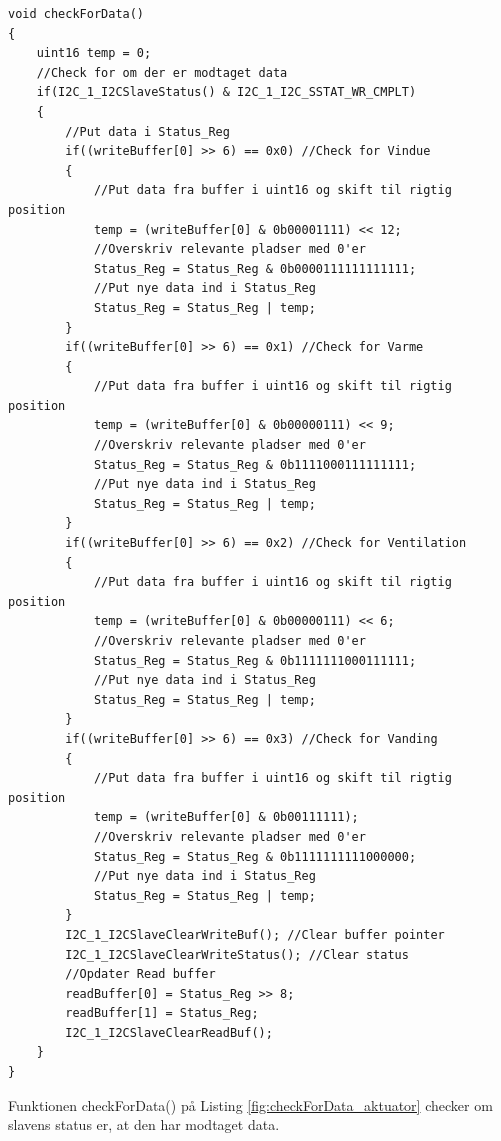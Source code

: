 \clearpage

\begin{lstlisting}[caption=Udsnit af checkForData.c for PSoC4 i Aktuator, label=fig:checkForData_aktuator]
void checkForData()
{
    uint16 temp = 0;
    //Check for om der er modtaget data
    if(I2C_1_I2CSlaveStatus() & I2C_1_I2C_SSTAT_WR_CMPLT)
    {
        //Put data i Status_Reg            
        if((writeBuffer[0] >> 6) == 0x0) //Check for Vindue
        {
            //Put data fra buffer i uint16 og skift til rigtig position
            temp = (writeBuffer[0] & 0b00001111) << 12; 
            //Overskriv relevante pladser med 0'er
            Status_Reg = Status_Reg & 0b0000111111111111;
            //Put nye data ind i Status_Reg
            Status_Reg = Status_Reg | temp;                
        }           
        if((writeBuffer[0] >> 6) == 0x1) //Check for Varme
        {
            //Put data fra buffer i uint16 og skift til rigtig position
            temp = (writeBuffer[0] & 0b00000111) << 9; 
            //Overskriv relevante pladser med 0'er
            Status_Reg = Status_Reg & 0b1111000111111111;
            //Put nye data ind i Status_Reg
            Status_Reg = Status_Reg | temp;                
        }           
        if((writeBuffer[0] >> 6) == 0x2) //Check for Ventilation
        {
            //Put data fra buffer i uint16 og skift til rigtig position
            temp = (writeBuffer[0] & 0b00000111) << 6; 
            //Overskriv relevante pladser med 0'er
            Status_Reg = Status_Reg & 0b1111111000111111;
            //Put nye data ind i Status_Reg
            Status_Reg = Status_Reg | temp;                
        }            
        if((writeBuffer[0] >> 6) == 0x3) //Check for Vanding
        {
            //Put data fra buffer i uint16 og skift til rigtig position
            temp = (writeBuffer[0] & 0b00111111); 
            //Overskriv relevante pladser med 0'er
            Status_Reg = Status_Reg & 0b1111111111000000;
            //Put nye data ind i Status_Reg
            Status_Reg = Status_Reg | temp;                
        }                    
        I2C_1_I2CSlaveClearWriteBuf(); //Clear buffer pointer
        I2C_1_I2CSlaveClearWriteStatus(); //Clear status                       
        //Opdater Read buffer
        readBuffer[0] = Status_Reg >> 8;
        readBuffer[1] = Status_Reg;     
        I2C_1_I2CSlaveClearReadBuf();
    }
}
\end{lstlisting}

\clearpage

Funktionen checkForData() på Listing \ref{fig:checkForData_aktuator} checker om slavens status er, at den har modtaget data. 

